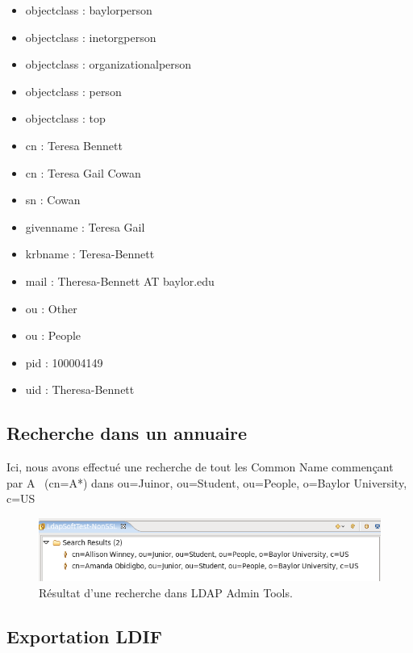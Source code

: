 \documentclass[12pt,a4paper,notitlepage]{article}
\begin{document}
\begin{itemize}
\item objectclass : baylorperson
\item objectclass : inetorgperson
\item objectclass : organizationalperson
\item objectclass : person
\item objectclass : top
\item cn : Teresa Bennett
\item cn : Teresa Gail Cowan
\item sn : Cowan
\item givenname : Teresa Gail
\item krbname : Teresa-Bennett
\item mail : Theresa-Bennett AT baylor.edu
\item ou : Other
\item ou : People
\item pid : 100004149
\item uid : Theresa-Bennett
\end{itemize}

  
\subsection{Recherche dans un annuaire}
Ici, nous avons effectué une recherche de tout les Common Name commençant par \og A \fg\ (cn=A*) dans ou=Juinor, ou=Student, ou=People, o=Baylor University, c=US

\begin{figure}[!h]
\begin{center}
\includegraphics[scale=0.61]{recherche}
\caption{Résultat d'une recherche dans LDAP Admin Tools.}
\label{fig:da}
\end{center}
\end{figure}

\subsection{Exportation LDIF}
\end{document}
